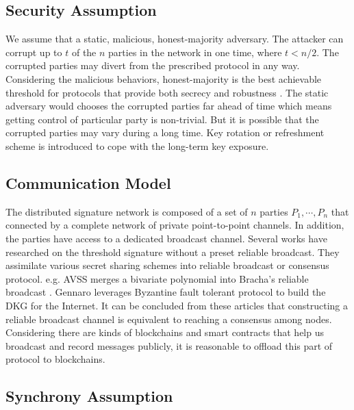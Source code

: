 \documentclass[11pt]{article}
\begin{document}
\subsection{Security Assumption}

We assume that a static, malicious, honest-majority adversary. The attacker can corrupt up to $t$ of the $n$ parties in the network in one time, where $t < n/2$. The corrupted parties may divert from the prescribed protocol in any way. Considering the malicious behaviors, honest-majority is the best achievable threshold for protocols that provide both secrecy and robustness \cite{gennaro2007secure}. The static adversary would chooses the corrupted parties far ahead of time which means getting control of particular party is non-trivial. But it is possible that the corrupted parties may vary during a long time. Key rotation or refreshment scheme is introduced to cope with the long-term key exposure.

\subsection{Communication Model}

The distributed signature network is composed of a set of $n$ parties $P_1, \cdots, P_n$ that connected by a complete network of private point-to-point channels. In addition, the parties have access to a dedicated broadcast channel. Several works\cite{kate2009distributed,kate2012distributed,cachin2002asynchronous} have researched on the threshold signature without a preset reliable broadcast. They assimilate various secret sharing schemes into reliable broadcast or consensus protocol. e.g. AVSS\cite{cachin2002asynchronous} merges a bivariate polynomial into Bracha’s reliable broadcast \cite{bracha1984asynchronous}. Gennaro\cite{gennaro2007secure} leverages Byzantine fault tolerant protocol\cite{castro1999practical} to build the DKG for the Internet. It can be concluded from these articles that constructing a reliable broadcast channel is equivalent to reaching a consensus among nodes. Considering there are kinds of blockchains and smart contracts that help us broadcast and record messages publicly, it is reasonable to offload this part of protocol to blockchains.

\subsection{Synchrony Assumption}
\end{document}

